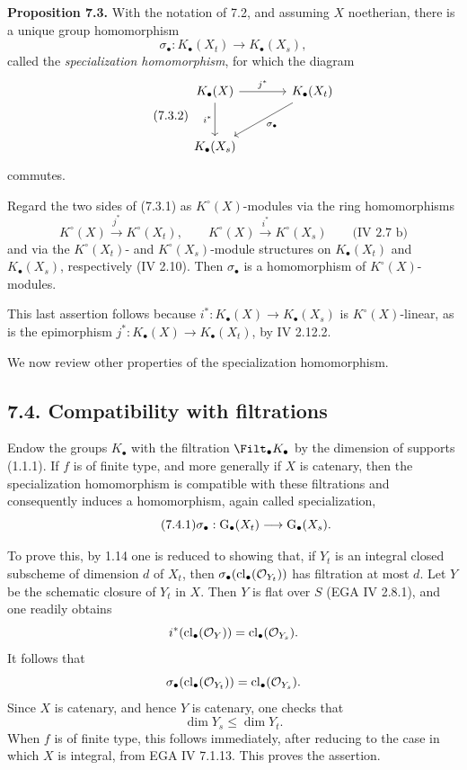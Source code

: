 \textbf{Proposition 7.3.}
With the notation of 7.2, and assuming $X$ noetherian, there is a unique
group homomorphism
\begin{equation}\tag{7.3.1}
\sigma_\bullet:K_\bullet(X_t)\longrightarrow K_\bullet(X_s),
\end{equation}
called the \emph{specialization homomorphism}, for which the diagram
\begin{equation}\tag{7.3.2}
\begin{tikzcd}[column sep=large,row sep=large]
K_\bullet(X) \arrow[r,"j^*"] \arrow[d,"i^*"'] &
K_\bullet(X_t) \arrow[dl,"\sigma_\bullet"]\\
K_\bullet(X_s) &
\end{tikzcd}
\end{equation}
commutes.

Regard the two sides of (7.3.1) as $K^\circ(X)$-modules via the ring
homomorphisms
\[
K^\circ(X)\xrightarrow{j^*}K^\circ(X_t),
\qquad
K^\circ(X)\xrightarrow{i^*}K^\circ(X_s)
\qquad\text{(IV 2.7 b)}
\]
and via the $K^\circ(X_t)$- and $K^\circ(X_s)$-module structures on
$K_\bullet(X_t)$ and $K_\bullet(X_s)$, respectively (IV 2.10). Then
$\sigma_\bullet$ is a homomorphism of $K^\circ(X)$-modules.

This last assertion follows because
$i^*:K_\bullet(X)\to K_\bullet(X_s)$ is $K^\circ(X)$-linear, as is the
epimorphism $j^*:K_\bullet(X)\to K_\bullet(X_t)$, by IV 2.12.2.

We now review other properties of the specialization homomorphism.

\subsection*{7.4. Compatibility with filtrations}
Endow the groups $K_\bullet$ with the filtration $\Filt_\bullet K_\bullet$
by the dimension of supports (1.1.1). If $f$ is of finite type, and more
generally if $X$ is catenary, then the specialization homomorphism is
compatible with these filtrations and consequently induces a homomorphism,
again called specialization,
\begin{equation}\tag{7.4.1}
\sigma_\bullet:\operatorname{G}_\bullet(X_t)\longrightarrow\operatorname{G}_\bullet(X_s).
\end{equation}

To prove this, by 1.14 one is reduced to showing that, if $Y_t$ is an
integral closed subscheme of dimension $d$ of $X_t$, then
$\sigma_\bullet(\operatorname{cl}_\bullet(\mathcal O_{Y_t}))$ has filtration at most
$d$. Let $Y$ be the schematic closure of $Y_t$ in $X$. Then $Y$ is flat
over $S$ (EGA IV 2.8.1), and one readily obtains
\[
i^*(\operatorname{cl}_\bullet(\mathcal O_Y))
=\operatorname{cl}_\bullet(\mathcal O_{Y_s}).
\]
It follows that
\[
\sigma_\bullet(\operatorname{cl}_\bullet(\mathcal O_{Y_t}))
=\operatorname{cl}_\bullet(\mathcal O_{Y_s}).
\]
Since $X$ is catenary, and hence $Y$ is catenary, one checks that
\[
\dim Y_s\leq\dim Y_t.
\]
When $f$ is of finite type, this follows immediately, after reducing to the
case in which $X$ is integral, from EGA IV 7.1.13. This proves the assertion.

